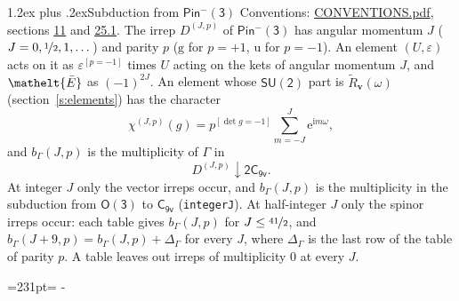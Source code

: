 \documentclass[10pt,a4paper]{article}
\makeatletter
\renewcommand\section{\@startsection{section}{1}{\z@}{-3ex plus -1ex minus -.2ex}%
  {1.2ex plus .2ex}{\normalfont\large\sffamily\bfseries\color{parttitle}}}
\newcommand{\needspace}[1]{\par\penalty-100\begingroup\dimen0=#1\relax\dimen2=\pagegoal
  \advance\dimen2-\pagetotal\ifdim\dimen0>\dimen2\relax\ifdim\dimen2>0pt\vfil\break\fi\fi
  \endgroup}
\numberwithin{equation}{section}
\newcommand{\eltfont}[1]{{\let\sigma\eltsigma\mathelt{#1}}}
\newcommand{\grp}[1]{\mathsf{#1}}
\newcommand{\elt}[1]{\eltfont{#1}}
\newcommand{\ptag}[1]{\mathrm{#1}}
\newcommand{\iverson}[1]{[#1]}
\newcommand{\restr}[2]{#1\!\downarrow#2}
\newcommand{\vv}{\mathbf{v}}
\newcommand{\iunit}{\mathrm{i}}
\newcommand{\expe}{\mathrm{e}}
\newcommand{\irrJp}[2]{D^{(#1,#2)}}
\newcommand{\barred}[1]{\bar{#1}}
\newcommand{\lift}[1]{\tilde{#1}}
\makeatother
\begin{document}
\section{Subduction from \texorpdfstring{$\grp{Pin^{-}(3)}$}{Pin(3)}}\label{s:subduction_parent}
Conventions: \href{../../CONVENTIONS.pdf}{CONVENTIONS.pdf}, sections \href{../../../rotation/CONVENTIONS.pdf\#conv.11}{11} and \href{../../CONVENTIONS.pdf\#conv.25.1}{25.1}.
\leavevmode\label{n:index.J}\label{n:index.parity}\label{n:irrep.o3}The irrep $\irrJp{J}{p}$ of \href{Pinminus3.pdf}{$\grp{Pin^{-}(3)}$} has angular momentum $J$ ($J = 0, \nicefrac{1}{2}, 1, \dots$) and parity $p$ ($\ptag{g}$ for $p = +1$, $\ptag{u}$ for $p = -1$). An element $(U, \varepsilon)$ acts on it as $\varepsilon^{[p = -1]}$ times $U$ acting on the kets of angular momentum $J$, and $\elt{\barred{E}}$ as $(-1)^{2J}$. \label{n:function.character.parent}\label{n:function.multiplicity}An element whose $\grp{SU(2)}$ part is $\lift{R}_{\vv}(\omega)$ (section~\ref{s:elements}) has the character
\begin{equation}\label{e:chi}\chi^{(J,p)}(g) = p^{\iverson{\det g = -1}}\sum_{m=-J}^{J} \expe^{\iunit m\omega},\end{equation}
and $b_\Gamma(J, p)$ is the multiplicity of $\Gamma$ in
\begin{equation}\label{e:parent}\restr{\irrJp{J}{p}}{\grp{2C_{9v}}}.\end{equation}
At integer $J$ only the vector irreps occur, and $b_\Gamma(J, p)$ is the multiplicity in the subduction from $\grp{O(3)}$ to \href{../../../rotation/data/pdf/C9v.pdf}{$\grp{C_{9v}}$} (\texttt{integerJ}). \label{n:index.increment}At half-integer $J$ only the spinor irreps occur: each table gives $b_\Gamma(J, p)$ for $J \le \nicefrac{41}{2}$, and $b_\Gamma(J + 9, p) = b_\Gamma(J, p) + \Delta_\Gamma$ for every $J$, where $\Delta_\Gamma$ is the last row of the table of parity $p$. A table leaves out irreps of multiplicity 0 at every $J$.
\needspace{231pt}
\end{document}
